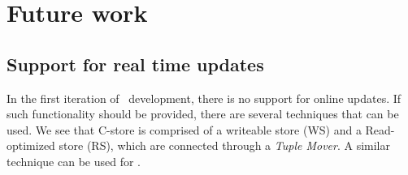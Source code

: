 \section{Future work}
\label{sec:Future work}
\subsection{Support for real time updates}
\label{sub:Support for real time updates}
In the first iteration of \projectName~development, there is no support for online updates. If such functionality should be provided, there are several techniques that can be used. We see that C-store \cite{Stonebraker2005-qz} is comprised of a writeable store (WS) and a Read-optimized store (RS), which are connected through a \textit{Tuple Mover}. A similar technique can be used for \projectName .
